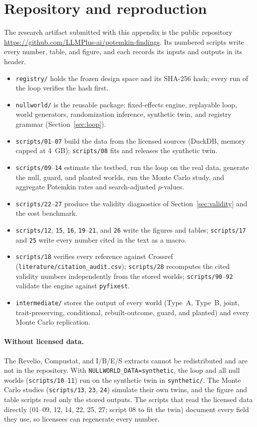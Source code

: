 \documentclass[11pt]{article}
\theoremstyle{remark}\newtheorem{remark}{Remark}
\begin{document}
\section{Repository and reproduction}\label{sec:repo}
The research artifact submitted with this appendix is the public repository \url{https://github.com/LLMPlus-ai/potemkin-findings}. Its numbered scripts write every number,
table, and figure, and each records its inputs and outputs in its header.
\begingroup\raggedright
\begin{itemize}
\item \texttt{registry/} holds the frozen design space and its SHA-256 hash; every run of the loop verifies the hash first.
\item \texttt{nullworld/} is the reusable package: fixed-effects engine, replayable loop, world generators, randomization
inference, synthetic twin, and registry grammar (Section~\ref{sec:loop}).
\item \texttt{scripts/01}--\texttt{07} build the data from the licensed sources (DuckDB, memory capped at 4~GB);
\texttt{scripts/08} fits and releases the synthetic twin.
\item \texttt{scripts/09}--\texttt{14} estimate the testbed, run the loop on the real data, generate the null, guard, and
planted worlds, run the Monte Carlo study, and aggregate Potemkin rates and search-adjusted $p$-values.
\item \texttt{scripts/22}--\texttt{27} produce the validity diagnostics of Section~\ref{sec:validity} and the cost benchmark.
\item \texttt{scripts/12}, \texttt{15}, \texttt{16}, \texttt{19}--\texttt{21}, and \texttt{26} write the figures and
tables; \texttt{scripts/17} and \texttt{25} write every number cited in the text as a macro.
\item \texttt{scripts/18} verifies every reference against Crossref (\texttt{literature/citation\_audit.csv});
\texttt{scripts/28} recomputes the cited validity numbers independently from the stored worlds;
\texttt{scripts/90}--\texttt{92} validate the engine against \texttt{pyfixest}.
\item \texttt{intermediate/} stores the output of every world (Type~A, Type~B, joint, trait-preserving, conditional,
rebuilt-outcome, guard, and planted) and every Monte Carlo replication.
\end{itemize}
\endgroup
\paragraph{Without licensed data.} The Revelio, Compustat, and I/B/E/S extracts cannot be redistributed and are not in
the repository. With \texttt{NULLWORLD\_DATA=synthetic}, the loop and all null worlds (\texttt{scripts/10}--\texttt{11})
run on the synthetic twin in \texttt{synthetic/}. The Monte Carlo studies (\texttt{scripts/13}, \texttt{23},
\texttt{24}) simulate their own twins, and the figure and table scripts read only the stored outputs. The scripts that
read the licensed data directly (01--09, 12, 14, 22, 25, 27; script 08 to fit the twin) document every field they use, so
licensees can regenerate every number.


\end{document}

